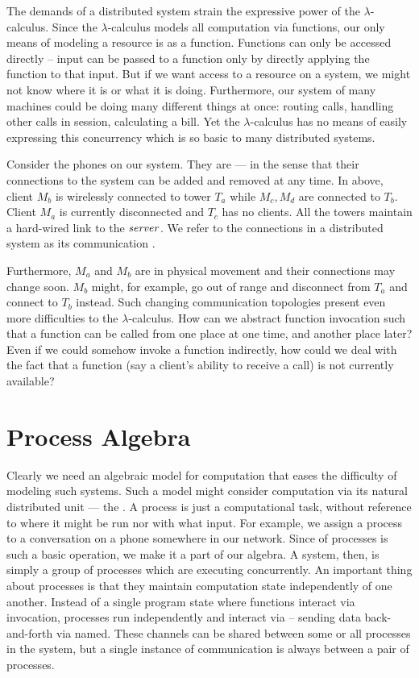 The demands of a distributed system strain the expressive power of the $\lambda$-calculus.  
Since the $\lambda$-calculus models all computation via functions, our only means of modeling a resource is as a function.  
Functions can only be accessed directly -- input can be passed to a function only by directly applying the function to that input.  
But if we want access to a resource on a system, we might not know where it is or what it is doing.  
Furthermore, our system of many machines could be doing many different things at once: routing calls, handling other calls in session, calculating a bill.  
Yet the $\lambda$-calculus has no means of easily expressing this concurrency which is so basic to many distributed systems.

Consider the phones on our system.  
They are  ---  in the sense that their connections to the system can be added and removed at any time.  
In  above, client $M_b$ is wirelessly connected to tower $T_a$ while $M_c,M_d$ are connected to $T_b$.  
Client $M_a$ is currently disconnected and $T_c$ has no clients.  
All the towers maintain a hard-wired link to the $\mbox{\emph{server}}$.  
We refer to the connections in a distributed system as its communication .

Furthermore, $M_a$ and $M_b$ are in physical movement and their connections may change soon.  
$M_b$ might, for example, go out of range and disconnect from $T_a$ and connect to $T_b$ instead.  
Such changing communication topologies present even more difficulties to the $\lambda$-calculus.  
How can we abstract function invocation such that a function can be called from one place at one time, and another place later?  Even if we could somehow invoke a function indirectly, how could we deal with the fact that a function (say a client's ability to receive a call) is not currently available?

\section{Process Algebra}
Clearly we need an algebraic model for computation that eases the difficulty of modeling such systems.  
Such a model might consider computation via its natural distributed unit ---  the . 
A process is just a computational task, without reference to where it might be run nor with what input.  
For example, we assign a process to a conversation on a phone somewhere in our network. 
Since  of processes is such a basic operation, we make it a part of our algebra.  
A system, then, is simply a group of processes which are executing concurrently. 
An important thing about processes is that they maintain computation state independently of one another.  
Instead of a single program state where functions interact via invocation, processes run independently and interact via  -- sending data back-and-forth via named.  These channels can be shared between some or all processes in the system, but a single instance of communication is always between a pair of processes.

